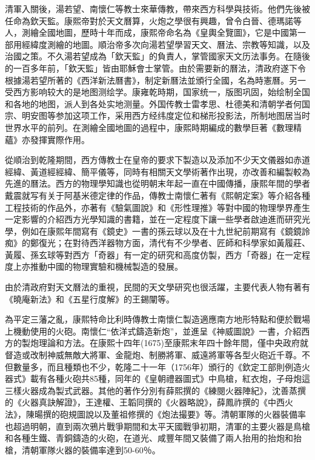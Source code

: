 清軍入關後，湯若望、南懷仁等教士來華傳教，帶來西方科學與技術。他們先後被任命為欽天監。康熙帝對於天文曆算，火炮之學很有興趣，曾令白晉、德瑪諾等人，測繪全國地圖，歷時十年而成，康熙帝命名為《皇輿全覽圖》，它是中國第一部用經緯度測繪的地圖。順治帝多次向湯若望學習天文、曆法、宗教等知識，以及治國之策。不久湯若望成為「欽天監」的負責人，掌管國家天文历法事务。在隨後的一百多年前，「欽天監」皆由耶穌會士掌管。由於需要新的曆法，清政府遂下令根據湯若望所著的《西洋新法曆書》，制定新曆法並頒行全國，名為時憲曆。另一受西方影响较大的是地图测绘学。康雍乾時期，国家统一，版图巩固，始绘制全国和各地的地图，派人到各处实地测量。外国传教士雷孝思、杜德美和清朝学者何国宗、明安图等参加这项工作，采用西方经纬度定位和梯形投影法，所制地图居当时世界水平的前列。在測繪全國地圖的過程中，康熙時期編成的數學巨著《數理精蘊》亦發揮實際作用。

從順治到乾隆期間，西方傳教士在皇帝的要求下製造以及添加不少天文儀器如赤道經緯、黃道經經緯、簡平儀等，同時有相關天文學術著作出現，亦改善和編製較為先進的曆法。西方的物理學知識也從明朝末年起一直在中國傳播，康熙年間的學者戴震就写有关于阿基米德定律的作品，傳教士南懷仁著有《熙朝定案》等介紹各種工程技術的作品外，亦著有《驗氣圖說》和《形性理推》等對中國的物理學界產生一定影響的介紹西方光學知識的書籍，並在一定程度下讓一些學者啟迪進而研究光學，例如在康熙年間寫有《鏡史》一書的孫云球以及在十九世紀前期寫有《鏡鏡詅痴》的鄭復光；在對待西洋器物方面，清代有不少學者、匠師和科學家如黃履莊、黃履、孫玄球等對西方「奇器」有一定的研究和高度仿製，西方「奇器」在一定程度上亦推動中國的物理實驗和機械製造的發展。

由於清政府對天文曆法的重視，民間的天文學研究也很活躍，主要代表人物有著有《曉庵新法》和《五星行度解》的王錫闡等。

為平定三藩之亂，康熙特命比利時傳教士南懷仁製造適應南方地形特點和便於戰場上機動使用的火砲。南懷仁“依洋式鑄造新炮”，並進呈《神威圖說》一書，介紹西方的製炮理論和方法。在康熙十四年(1675)至康熙末年四十餘年間，僅中央政府就督造或改制神威無敵大將軍、金龍炮、制勝將軍、威遠將軍等各型火砲近千尊。不但數量多，而且種類也不少，乾隆二十一年（1756年）頒行的《欽定工部則例造火器式》載有各種火砲共85種，同年的《皇朝禮器圖式》中鳥槍，紅衣炮，子母炮這三樣火器成為製式武器。其他的著作分別有薛熙撰的《練閱火器陣紀》，沈善蒸撰的《火器真訣解證》，王達權、王韜同撰的《火器略說》，薛鳳祚撰的《中西火法》，陳暘撰的砲規圖說以及董祖修撰的《炮法撮要》等。清朝軍隊的火器裝備率也超過明朝，直到兩次鴉片戰爭期間和太平天國戰爭初期，清軍的主要火器是鳥槍和各種生鐵、青銅鑄造的火砲，在道光、咸豐年間又裝備了兩人抬用的抬炮和抬槍，清朝軍隊火器的裝備率達到50-60％。

